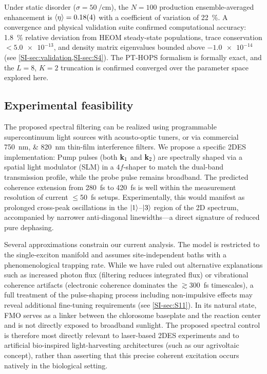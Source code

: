 \documentclass[journal=jpcl,manuscript=letter]{achemso}
\begin{document}
Under static disorder ($\sigma = \SI{50}{\per\centi\meter}$), the $N=100$ production ensemble-averaged enhancement is $\expval{\eta} = 0.18(4)$ with a coefficient of variation of \SI{22}{\percent}. A convergence and physical validation suite confirmed computational accuracy: \SI{1.8}{\percent} relative deviation from HEOM steady-state populations, trace conservation $< \num{5.0e-13}$, and density matrix eigenvalues bounded above $\num{-1.0e-14}$ (see \cref{SI-sec:validation,SI-sec:S4}). The PT-HOPS formalism is formally exact, and the $L=8$, $K=2$ truncation is confirmed converged over the parameter space explored here.

\subsection*{Experimental feasibility}

The proposed spectral filtering can be realized using programmable supercontinuum light sources with acousto-optic tuners,\cite{Gunthardt2023} or via commercial \SIlist{750;820}{\nano\meter} thin-film interference filters. We propose a specific 2DES implementation:\cite{Sebastian2024} Pump pulses (both $\vb{k}_1$ and $\vb{k}_2$) are spectrally shaped via a spatial light modulator (SLM) in a $4f$-shaper to match the dual-band transmission profile, while the probe pulse remains broadband.
The predicted coherence extension from \SI{280}{\femto\second} to \SI{420}{\femto\second} is well within the measurement resolution of current $\leq$\SI{50}{\femto\second} setups.\cite{Engel2007} Experimentally, this would manifest as prolonged cross-peak oscillations in the $\ket{1}$--$\ket{3}$ region of the 2D spectrum, accompanied by narrower anti-diagonal linewidths—a direct signature of reduced pure dephasing. 

Several approximations constrain our current analysis. The model is restricted to the single-exciton manifold and assumes site-independent baths with a phenomenological trapping rate. While we have ruled out alternative explanations such as increased photon flux (filtering reduces integrated flux) or vibrational coherence artifacts (electronic coherence dominates the $\gtrsim$\SI{300}{\femto\second} timescales), a full treatment of the pulse-shaping process including non-impulsive effects may reveal additional fine-tuning requirements (see \cref{SI-sec:S11}). In its natural state, FMO serves as a linker between the chlorosome baseplate and the reaction center and is not directly exposed to broadband sunlight.\cite{Blankenship2011} The proposed spectral control is therefore most directly relevant to laser-based 2DES experiments and to artificial bio-inspired light-harvesting architectures (such as our agrivoltaic concept), rather than asserting that this precise coherent excitation occurs natively in the biological setting.
\end{document}
